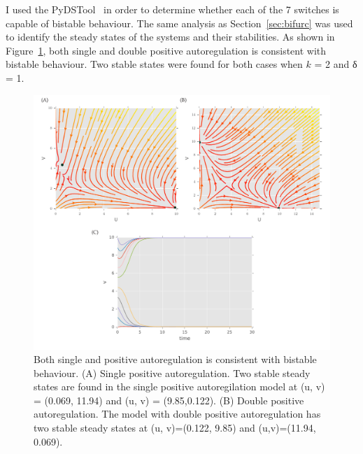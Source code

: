 I used the PyDSTool~\autocite{Clewley:2012kj} in order to determine whether each of the 7 switches is capable of bistable behaviour. The same analysis as Section~\ref{sec:bifurc} was used to identify the steady states of the systems and their stabilities. As shown in Figure~\ref{fig:Gard_pos}, both single and double positive autoregulation is consistent with bistable behaviour. Two stable states were found for both cases when $k$ = 2 and δ = 1. 


\begin{figure}[htbp]
	\begin{center}
\includegraphics[scale=0.6]{../../chapters/chapterABCSysBio/images/gard_pos.pdf}
\caption[Phase plane analysis of the switch with positive autoregulation]{\label{fig:Gard_pos}Both single and positive autoregulation is consistent with bistable behaviour.  (A) Single positive autoregulation. Two stable steady states are found in the single positive autoregilation model at (u, v) = (0.069, 11.94) and (u, v) = (9.85,0.122). (B) Double positive autoregulation. The model with double positive autoregulation has two stable steady states at (u, v)=(0.122, 9.85) and (u,v)=(11.94, 0.069).}
\end{center}
\end{figure}


